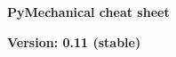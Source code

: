 \documentclass[9pt,landscape]{article}
\begin{document}
\raggedright
\footnotesize

\begin{center}
     \Huge{\textbf{PyMechanical cheat sheet}} \\
\end{center}

\begin{center}
  \small{\textbf{Version: 0.11 (stable)}} \\
\end{center}

\vspace{-0.40cm}
\noindent\makebox[\linewidth]{\rule{\paperwidth}{2pt}}
\end{document}

